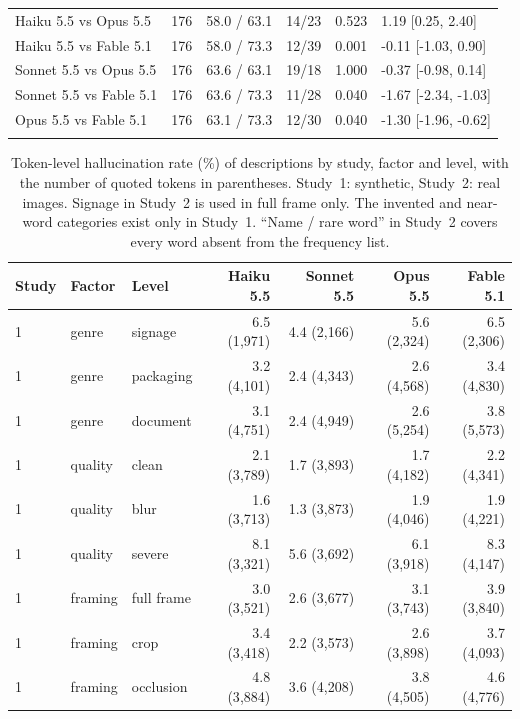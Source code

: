 \documentclass[pdflatex,sn-mathphys-num]{sn-jnl}%
\theoremstyle{thmstyleone}%
\theoremstyle{thmstyletwo}%
\theoremstyle{thmstylethree}%
\begin{document}
\begin{appendices}
\begin{table}[!tbp]
\begin{tabular*}{\textwidth}{@{\extracolsep\fill}lrrrrl}
Haiku 5.5 vs Opus 5.5 & 176 & 58.0 / 63.1 & 14/23 & 0.523 & 1.19 [0.25, 2.40] \\
Haiku 5.5 vs Fable 5.1 & 176 & 58.0 / 73.3 & 12/39 & 0.001 & -0.11 [-1.03, 0.90] \\
Sonnet 5.5 vs Opus 5.5 & 176 & 63.6 / 63.1 & 19/18 & 1.000 & -0.37 [-0.98, 0.14] \\
Sonnet 5.5 vs Fable 5.1 & 176 & 63.6 / 73.3 & 11/28 & 0.040 & -1.67 [-2.34, -1.03] \\
Opus 5.5 vs Fable 5.1 & 176 & 63.1 / 73.3 & 12/30 & 0.040 & -1.30 [-1.96, -0.62] \\
\botrule
\end{tabular*}
\end{table}


\begin{table}[!tbp]
\caption{Token-level hallucination rate (\%) of descriptions by study, factor and level, with the number of quoted tokens in parentheses. Study~1: synthetic, Study~2: real images. Signage in Study~2 is used in full frame only. The invented and near-word categories exist only in Study~1. ``Name / rare word'' in Study~2 covers every word absent from the frequency list.}\label{tab:breakdown}
\footnotesize
\setlength{\tabcolsep}{3pt}
\begin{tabular*}{\textwidth}{@{\extracolsep\fill}lllrrrr}
\toprule
Study & Factor & Level & Haiku 5.5 & Sonnet 5.5 & Opus 5.5 & Fable 5.1 \\
\midrule
1 & genre & signage & 6.5 (1{,}971) & 4.4 (2{,}166) & 5.6 (2{,}324) & 6.5 (2{,}306) \\
1 & genre & packaging & 3.2 (4{,}101) & 2.4 (4{,}343) & 2.6 (4{,}568) & 3.4 (4{,}830) \\
1 & genre & document & 3.1 (4{,}751) & 2.4 (4{,}949) & 2.6 (5{,}254) & 3.8 (5{,}573) \\
1 & quality & clean & 2.1 (3{,}789) & 1.7 (3{,}893) & 1.7 (4{,}182) & 2.2 (4{,}341) \\
1 & quality & blur & 1.6 (3{,}713) & 1.3 (3{,}873) & 1.9 (4{,}046) & 1.9 (4{,}221) \\
1 & quality & severe & 8.1 (3{,}321) & 5.6 (3{,}692) & 6.1 (3{,}918) & 8.3 (4{,}147) \\
1 & framing & full frame & 3.0 (3{,}521) & 2.6 (3{,}677) & 3.1 (3{,}743) & 3.9 (3{,}840) \\
1 & framing & crop & 3.4 (3{,}418) & 2.2 (3{,}573) & 2.6 (3{,}898) & 3.7 (4{,}093) \\
1 & framing & occlusion & 4.8 (3{,}884) & 3.6 (4{,}208) & 3.8 (4{,}505) & 4.6 (4{,}776) \\

\end{tabular*}
\end{table}
\end{appendices}
\end{document}
